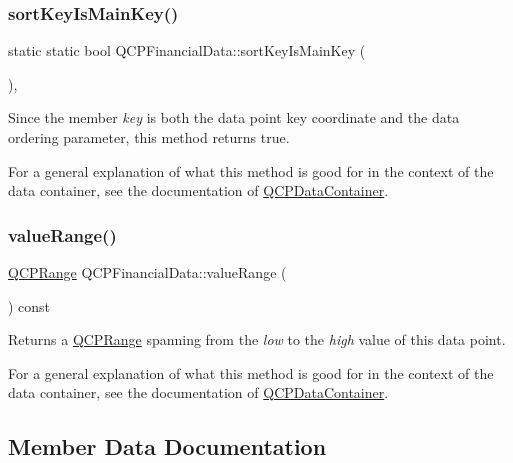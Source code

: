 \subsubsection{\texorpdfstring{sort\+Key\+Is\+Main\+Key()}{sortKeyIsMainKey()}}
{\footnotesize\ttfamily static static bool Q\+C\+P\+Financial\+Data\+::sort\+Key\+Is\+Main\+Key (\begin{DoxyParamCaption}{ }\end{DoxyParamCaption})\hspace{0.3cm}{\ttfamily [inline]}, {\ttfamily [static]}}

Since the member {\itshape key} is both the data point key coordinate and the data ordering parameter, this method returns true.

For a general explanation of what this method is good for in the context of the data container, see the documentation of \hyperlink{class_q_c_p_data_container}{Q\+C\+P\+Data\+Container}. \mbox{\label{class_q_c_p_financial_data_a164d5584eeeb9ba48b4b595ac2ac7fcf}} 
\subsubsection{\texorpdfstring{value\+Range()}{valueRange()}}
{\footnotesize\ttfamily \hyperlink{class_q_c_p_range}{Q\+C\+P\+Range} Q\+C\+P\+Financial\+Data\+::value\+Range (\begin{DoxyParamCaption}{ }\end{DoxyParamCaption}) const\hspace{0.3cm}{\ttfamily [inline]}}

Returns a \hyperlink{class_q_c_p_range}{Q\+C\+P\+Range} spanning from the {\itshape low} to the {\itshape high} value of this data point.

For a general explanation of what this method is good for in the context of the data container, see the documentation of \hyperlink{class_q_c_p_data_container}{Q\+C\+P\+Data\+Container}. 

\subsection{Member Data Documentation}
\mbox{\label{class_q_c_p_financial_data_a45e9b96944c4a08ea6c82a72d3d22df2}} 
